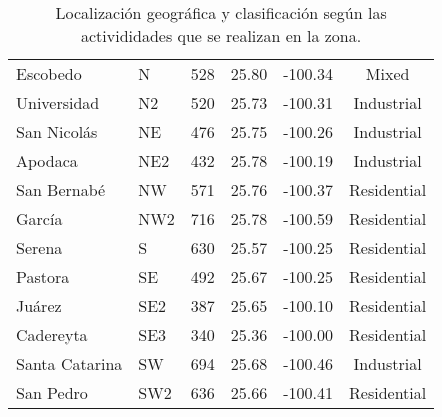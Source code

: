 \begin{table}[H]
\begin{tabular}{llcccc}
        Escobedo       & N    & 528             & 25.80    & -100.34   & Mixed          \\
        Universidad    & N2   & 520             & 25.73    & -100.31   & Industrial     \\
        San Nicolás    & NE   & 476             & 25.75    & -100.26   & Industrial     \\
        Apodaca        & NE2  & 432             & 25.78    & -100.19   & Industrial     \\
        San Bernabé    & NW   & 571             & 25.76    & -100.37   & Residential    \\
        García         & NW2  & 716             & 25.78    & -100.59   & Residential    \\
        Serena         & S    & 630             & 25.57    & -100.25   & Residential    \\
        Pastora        & SE   & 492             & 25.67    & -100.25   & Residential    \\
        Juárez         & SE2  & 387             & 25.65    & -100.10   & Residential    \\
        Cadereyta      & SE3  & 340             & 25.36    & -100.00   & Residential    \\
        Santa Catarina & SW   & 694             & 25.68    & -100.46   & Industrial     \\
        San Pedro      & SW2  & 636             & 25.66    & -100.41   & Residential    \\ \hline
    \end{tabular}
    \caption{Localización geográfica y clasificación según las activididades que se realizan en la zona.}
    \label{table:stations_loc}
\end{table}